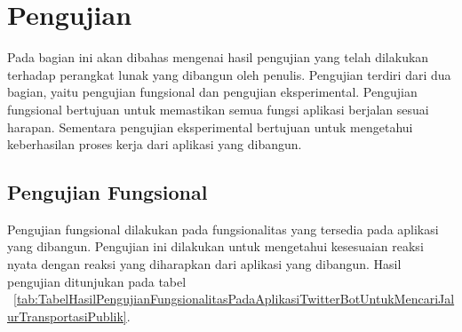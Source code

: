 \newpage
\section{Pengujian}
Pada bagian ini akan dibahas mengenai hasil pengujian yang telah dilakukan terhadap perangkat lunak yang dibangun oleh penulis. Pengujian terdiri dari dua bagian, yaitu pengujian fungsional dan pengujian eksperimental. Pengujian fungsional bertujuan untuk memastikan semua fungsi aplikasi berjalan sesuai harapan. Sementara pengujian eksperimental bertujuan untuk mengetahui keberhasilan proses kerja dari aplikasi yang dibangun.

\subsection{Pengujian Fungsional}
Pengujian fungsional dilakukan pada fungsionalitas yang tersedia pada aplikasi yang dibangun. Pengujian ini dilakukan untuk mengetahui kesesuaian reaksi nyata dengan reaksi yang diharapkan dari aplikasi yang dibangun. Hasil pengujian ditunjukan pada tabel ~\ref{tab:TabelHasilPengujianFungsionalitasPadaAplikasiTwitterBotUntukMencariJalurTransportasiPublik}.

